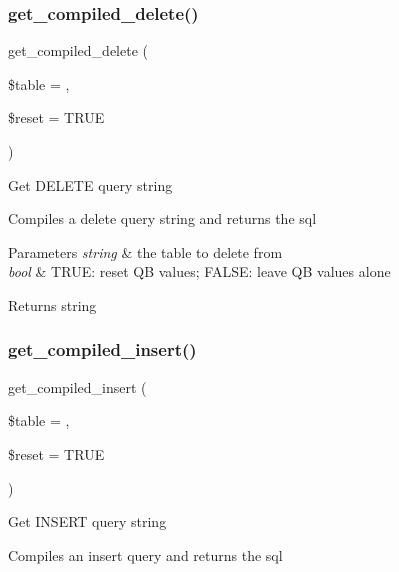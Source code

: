 \subsubsection{\texorpdfstring{get\+\_\+compiled\+\_\+delete()}{get\_compiled\_delete()}}
{\footnotesize\ttfamily get\+\_\+compiled\+\_\+delete (\begin{DoxyParamCaption}\item[{}]{\$table = {\ttfamily \textquotesingle{}\textquotesingle{}},  }\item[{}]{\$reset = {\ttfamily TRUE} }\end{DoxyParamCaption})}

Get D\+E\+L\+E\+TE query string

Compiles a delete query string and returns the sql


\begin{DoxyParams}{Parameters}
{\em string} & the table to delete from \\
\hline
{\em bool} & T\+R\+UE\+: reset QB values; F\+A\+L\+SE\+: leave QB values alone \\
\hline
\end{DoxyParams}
\begin{DoxyReturn}{Returns}
string 
\end{DoxyReturn}
\mbox{\label{class_c_i___d_b__query__builder_a09abce3658cfaba8d8a148c91a9be0ea}} 
\subsubsection{\texorpdfstring{get\+\_\+compiled\+\_\+insert()}{get\_compiled\_insert()}}
{\footnotesize\ttfamily get\+\_\+compiled\+\_\+insert (\begin{DoxyParamCaption}\item[{}]{\$table = {\ttfamily \textquotesingle{}\textquotesingle{}},  }\item[{}]{\$reset = {\ttfamily TRUE} }\end{DoxyParamCaption})}

Get I\+N\+S\+E\+RT query string

Compiles an insert query and returns the sql


